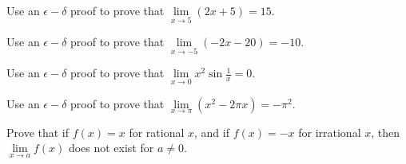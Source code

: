\documentclass[12pt,letterpaper]{hmcpset}
\begin{document}

\begin{problem}
    Use an $\epsilon-\delta$ proof to prove that $\lim\limits_{x\to 5}\left(2x+5\right) = 15$.
\end{problem}

\begin{solution}

\end{solution}

\begin{problem}
    Use an $\epsilon-\delta$ proof to prove that $\lim\limits_{x\to -5}\left(-2x-20\right) = -10$.
\end{problem}

\begin{solution}

\end{solution}

\begin{problem}
    Use an $\epsilon-\delta$ proof to prove that $\lim\limits_{x\to 0} x^2\sin{\frac{1}{x}} = 0$.
\end{problem}

\begin{solution}

\end{solution}

\begin{problem}
    Use an $\epsilon-\delta$ proof to prove that $\lim\limits_{x\to \pi}\left(x^2 - 2\pi x\right) = -\pi^2$.
\end{problem}

\begin{solution}

\end{solution}

\begin{problem}
    Prove that if $f\left(x\right) = x$ for rational $x$, and if $f\left(x\right) = -x$ for irrational $x$, then $\lim\limits_{x\to a}f\left(x\right)$ does not exist for $a \ne 0$.
\end{problem}

\begin{solution}

\end{solution}

\end{document}
